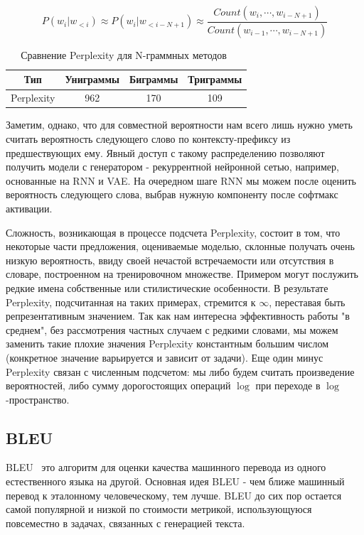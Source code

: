 \documentclass{spbau-diploma}
\begin{document}
\begin{equation}
\label{perplexity_ngram}
P(w_i | w_{<i}) \approx P(w_i | w_{<i-N+1}) 
\approx \frac{Count(w_i, \cdots, w_{i-N+1})}{Count(w_{i-1}, \cdots, w_{i-N+1})}
\end{equation}

\begin{table}[H]
\centering
\begin{tabular}{c | c c c}
\toprule
Тип & Униграммы & Биграммы & Триграммы \\
\midrule
Perplexity & 962 & 170 & 109 \\
\bottomrule
\end{tabular}
\caption{Сравнение Perplexity для N-граммных методов~\cite{book:salp}}
\label{ngram_comp}
\end{table}

Заметим, однако, что для совместной вероятности нам всего лишь нужно уметь 
считать вероятность следующего слово по контексту-префиксу из предшествующих 
ему. Явный доступ с такому распределению позволяют получить модели с 
генератором - рекуррентной нейронной сетью, например, основанные на RNN и VAE. 
На очередном шаге RNN мы можем после оценить вероятность следующего слова, 
выбрав нужную компоненту после софтмакс активации.

Сложность, возникающая в процессе подсчета Perplexity, состоит в том, что 
некоторые части предложения, оцениваемые моделью, склонные получать очень 
низкую вероятность, ввиду своей нечастой встречаемости или отсутствия в 
словаре, построенном на тренировочном множестве. Примером могут послужить редкие 
имена собственные или стилистические особенности. В результате Perplexity, 
подсчитанная на таких примерах, стремится к $\infty$, переставая быть 
репрезентативным значением. Так как нам интересна эффективность работы "в 
среднем", без рассмотрения частных случаем с редкими словами, мы можем заменить 
такие плохие значения Perplexity константным большим числом (конкретное 
значение варьируется и зависит от задачи). Еще один минус Perplexity связан с
численным подсчетом: мы либо будем считать произведение вероятностей, либо 
сумму дорогостоящих операций $\log$ при переходе в $\log$-пространство.

\subsection{BLEU}
BLEU~\cite{bleu} это алгоритм для оценки качества машинного перевода из одного 
естественного языка на другой. 
Основная идея BLEU - чем ближе машинный перевод к эталонному
человеческому, тем лучше. BLEU до сих пор остается самой популярной и низкой
по стоимости метрикой, использующуюся повсеместно в задачах, связанных с 
генерацией текста.
\end{document}
